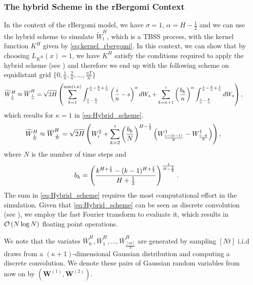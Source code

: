 \subsubsection{The hybrid Scheme in the rBergomi Context}
In the context of the rBergomi model, we have $\sigma=1$, $\alpha=H-\frac{1}{2}$ and we can  use the hybrid scheme to simulate $\widetilde{W}^H_t$, which is  a TBSS process, with the kernel function $K^H$ given by \eqref{eq:kernel_rbergomi}. In this context, we can show that by choosing $L_{K^H}(x)=1$, we have  $K^H$ satisfy the conditions required to apply the hybrid scheme  (see \cite{bennedsen2017hybrid}) and therefore we end up with
the following scheme on equidistant grid $\{0,\frac{1}{n},\frac{2}{n},\dots,\frac{nT}{n}\}$
\begin{align}\label{eq:Hybrid_scheme_pre}
\widetilde{W}^H_{\frac{i}{n}} \approx \overline{W}^H_{\frac{i}{n}}&= \sqrt{2H} \left(  \sum_{k=1}^{\min(i,\kappa)} \int_{\frac{i}{n}-\frac{k}{n}}^{\frac{i}{n}-\frac{k}{n}+\frac{1}{n}} \left(\frac{i}{n}-s\right)^\alpha dW_s+\sum_{k=\kappa+1}^{i} \left(\frac{b_k}{n}\right)^{\alpha}  \int_{\frac{i}{n}-\frac{k}{n}}^{\frac{i}{n}-\frac{k}{n}+\frac{1}{n}} dW_s \right) ,
\end{align}
which results for $\kappa=1$  in \eqref{eq:Hybrid_scheme}.
\begin{align}\label{eq:Hybrid_scheme}
\widetilde{W}^H_{\frac{i}{N}} \approx \overline{W}^H_{\frac{i}{N}}&= \sqrt{2H} \left(  W^2_i+\sum_{k=2}^{i} \left(\frac{b_k}{N}\right)^{H-\frac{1}{2}} \left(W_{\frac{i-(k-1)}{N}}^1-W_{\frac{i-k}{N}}^1\right)\right),
\end{align}
where $N$ is the number of time steps and 
$$ b_k=\left(\frac{k^{H+\frac{1}{2}}-(k-1)^{H+\frac{1}{2} }}{H+\frac{1}{2}}\right)^{\frac{1}{H-\frac{1}{2}}} .$$
The sum in \eqref{eq:Hybrid_scheme} requires the most computational effort in the simulation. Given that \eqref{eq:Hybrid_scheme} can be seen as discrete convolution  (see \cite{bennedsen2017hybrid}), we employ the fast Fourier transform to evaluate it, which results in  ${\mathcal{O}}\left(N \log N\right)$ floating point operations.

We note that the variates $\bar{W}_0^{H},\bar{W}_1^{H},\dots,\bar{W}_{\frac{[Nt]}{N}}^{H}$ are  generated by sampling $[Nt]$ i.i.d draws from a $(\kappa+1)$-dimensional Gaussian distribution and computing a discrete convolution. We denote these pairs  of Gaussian random variables from now on by $(\mathbf{W}^{(1)},\mathbf{W}^{(2)})$.
